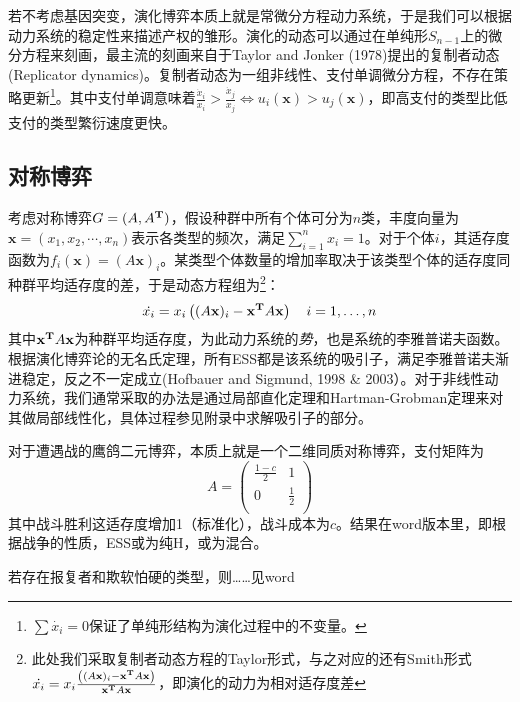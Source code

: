 \documentclass[lang=cn,12pt,a4paper]{elegantpaper}
\begin{document}
若不考虑基因突变，演化博弈本质上就是常微分方程动力系统，于是我们可以根据动力系统的稳定性来描述产权的雏形。演化的动态可以通过在单纯形$S_{n-1}$上的微分方程来刻画，最主流的刻画来自于Taylor and Jonker (1978)提出的复制者动态(Replicator dynamics)。复制者动态为一组非线性、支付单调微分方程，不存在策略更新\footnote{$\sum {\dot {x_i}=0}$保证了单纯形结构为演化过程中的不变量。}。其中支付单调意味着$\frac{\dot{x}_{i}}{x_{i}}>\frac{\dot{x}_{j}}{x_{j}} \Longleftrightarrow u_{i}(\mathbf{x})>u_{j}(\mathbf{x})$，即高支付的类型比低支付的类型繁衍速度更快。




\subsection{对称博弈}

考虑对称博弈$G=(A,A^{\bf{T}})$，假设种群中所有个体可分为$n$类，丰度向量为$\mathbf{x}=(x_1,x_2,\cdots,x_n)$表示各类型的频次，满足$ \sum_{i=1}^nx_i=1$。对于个体$i$，其适存度函数为$f_{i}(\mathbf{x})=(A \mathbf{x})_{i}$。某类型个体数量的增加率取决于该类型个体的适存度同种群平均适存度的差，于是动态方程组为\footnote{此处我们采取复制者动态方程的Taylor形式，与之对应的还有Smith形式$\dot{{x}_{i}}=x_{i}\frac{\left((A \mathbf{x})_{i}-\mathbf{x}^{\bf{T}}  A \mathbf{x}\right)}{\mathbf{x}^{\bf{T}}  A \mathbf{x}}$，即演化的动力为相对适存度差}：
\begin{equation}
\dot{{x}_{i}}=x_{i}\left((A \mathbf{x})_{i}-\mathbf{x}^{\bf{T}}  A \mathbf{x}\right) \quad i=1, \ldots, n
\end{equation}
其中$\mathbf{x}^{\bf{T}}  A \mathbf{x} $为种群平均适存度，为此动力系统的\textit{势}，也是系统的李雅普诺夫函数。根据演化博弈论的无名氏定理，所有ESS都是该系统的吸引子，满足李雅普诺夫渐进稳定，反之不一定成立(Hofbauer and Sigmund, 1998 & 2003）。对于非线性动力系统，我们通常采取的办法是通过局部直化定理和Hartman-Grobman定理来对其做局部线性化，具体过程参见附录中求解吸引子的部分。

对于遭遇战的鹰鸽二元博弈，本质上就是一个二维同质对称博弈，支付矩阵为
\begin{equation}
A=\begin{pmatrix}
\frac{1-c}{2} & 1\\
0 & \frac{1}{2}\\
\end{pmatrix}
\end{equation}
其中战斗胜利这适存度增加1（标准化），战斗成本为$c$。结果在word版本里，即根据战争的性质，ESS或为纯H，或为混合。

若存在报复者和欺软怕硬的类型，则……见word
\end{document}
